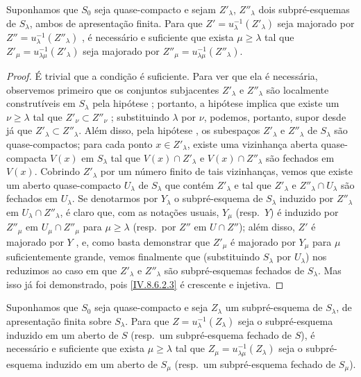 \begin{corollary}[8.6.3.1]
\label{IV.8.6.3.1}
Suponhamos que $S_0$ seja quase-compacto e sejam $Z'_\lambda$, $Z''_\lambda$ dois subpré-esquemas de $S_\lambda$, ambos de apresentação finita.
Para que $Z'=u_\lambda^{-1}(Z'_\lambda)$ seja majorado por $Z''=u_\lambda^{-1}(Z''_\lambda)$ , é necessário e suficiente que exista $\mu\geqslant\lambda$ tal que $Z'_\mu=u_{\lambda\mu}^{-1}(Z'_\lambda)$ seja majorado por $Z''_\mu=u_{\lambda\mu}^{-1}(Z''_\lambda)$.
\end{corollary}

\begin{proof}
É trivial que a condição é suficiente.
Para ver que ela é necessária, observemos primeiro que os conjuntos subjacentes $Z'_\lambda$ e $Z''_\lambda$ são localmente construtíveis em $S_\lambda$ pela hipótese ; portanto, a hipótese implica que existe um $\nu\geqslant\lambda$ tal que $Z'_\nu\subset Z''_\nu$ ; substituindo $\lambda$ por $\nu$, podemos, portanto, supor desde já que $Z'_\lambda\subset Z''_\lambda$.
Além disso, pela hipótese , os subespaços $Z'_\lambda$ e $Z''_\lambda$ de $S_\lambda$ são quase-compactos; para cada ponto $x\in Z'_\lambda$, existe uma vizinhança aberta quase-compacta $V(x)$ em $S_\lambda$ tal que $V(x)\cap Z'_\lambda$ e $V(x)\cap Z''_\lambda$ são fechados em $V(x)$.
Cobrindo $Z'_\lambda$ por um número finito de tais vizinhanças, vemos que existe um aberto quase-compacto $U_\lambda$ de $S_\lambda$ que contém $Z'_\lambda$ e tal que $Z'_\lambda$ e $Z''_\lambda\cap U_\lambda$ são fechados em $U_\lambda$.
Se denotarmos por $Y_\lambda$ o subpré-esquema de $S_\lambda$ induzido por $Z''_\lambda$ em $U_\lambda\cap Z''_\lambda$, é claro que, com as notações usuais, $Y_\mu$ (resp.\ $Y$) é induzido por $Z''_\mu$ em $U_\mu\cap Z''_\mu$ para $\mu\geqslant\lambda$ (resp.\ por $Z''$ em $U\cap Z''$); além disso, $Z'$ é majorado por $Y$ , e, como basta demonstrar que $Z'_\mu$ é majorado por $Y_\mu$ para $\mu$
 suficientemente grande, vemos finalmente que (substituindo $S_\lambda$ por $U_\lambda$) nos reduzimos ao caso em que $Z'_\lambda$ e $Z''_\lambda$ são subpré-esquemas fechados de $S_\lambda$.
Mas isso já foi demonstrado, pois \eqref{IV.8.6.2.3} é crescente e injetiva.
\end{proof}

\begin{corollary}[8.6.4]
\label{IV.8.6.4}
Suponhamos que $S_0$ seja quase-compacto e seja $Z_\lambda$ um subpré-esquema de $S_\lambda$, de apresentação finita sobre $S_\lambda$.
Para que $Z=u_\lambda^{-1}(Z_\lambda)$ seja o subpré-esquema induzido em um aberto de $S$ (resp.\ um subpré-esquema fechado de $S$), é necessário e suficiente que exista $\mu\geqslant\lambda$ tal que $Z_\mu=u_{\lambda\mu}^{-1}(Z_\lambda)$ seja o subpré-esquema induzido em um aberto de $S_\mu$ (resp.\ um subpré-esquema fechado de $S_\mu$).
\end{corollary}

